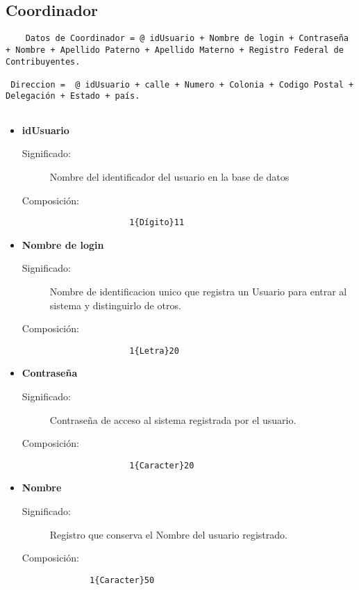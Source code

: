 \subsection{Coordinador}\label{dd:Coordinador}
\begin{lstlisting}
	Datos de Coordinador = @ idUsuario + Nombre de login + Contraseña + Nombre + Apellido Paterno + Apellido Materno + Registro Federal de Contribuyentes.
  
 Direccion =  @ idUsuario + calle + Numero + Colonia + Codigo Postal + Delegación + Estado + país.
 
\end{lstlisting}
\begin{itemize}
	\item	\textbf{idUsuario}\label{dd:idUsuarioC}
		\begin{description}
			\item [Significado:] Nombre del identificador del usuario en la base de datos
			\item [Composición:]{\begin{lstlisting}
				1{Dígito}11\end{lstlisting}}
		\end{description}
	\item \textbf{Nombre de login}\label{dd:loginC}
		\begin{description}
			\item [Significado:] Nombre de identificacion unico que registra un Usuario para entrar al sistema y distinguirlo de otros.
			\item [Composición:]{\begin{lstlisting}
				1{Letra}20\end{lstlisting}}
		\end{description}
	\item \textbf{Contraseña}\label{dd:pswC}
		\begin{description}
			\item [Significado:] Contraseña de acceso al sistema registrada por el usuario.
			\item [Composición:]{\begin{lstlisting}
				1{Caracter}20\end{lstlisting}}
		\end{description}
 
 \item \textbf{Nombre}\label{dd:nombreC}
    \begin{description}
      \item [Significado:] Registro que conserva el Nombre del usuario registrado.
      \item [Composición:]{\begin{lstlisting}
        1{Caracter}50\end{lstlisting}}
    \end{description}


\end{itemize}
